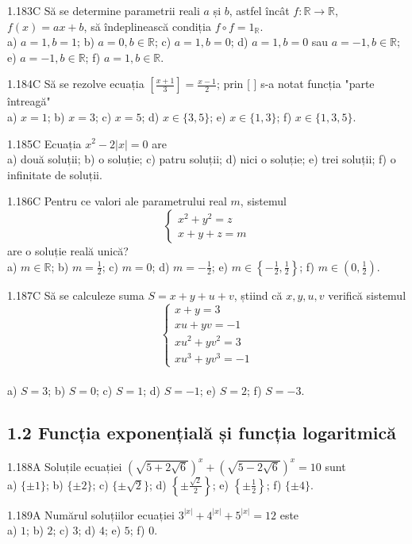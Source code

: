 \documentclass[11pt]{article}
\begin{document}
1.183C Să se determine parametrii reali $a$ și $b$, astfel încât $f: \mathbb{R} \rightarrow \mathbb{R}$, $f(x)=a x+b$, să îndeplinească condiția $f \circ f=1_{\mathbb{R}}$.\\ a) $a=1, b=1$; b) $a=0, b \in \mathbb{R}$; c) $a=1, b=0$; d) $a=1, b=0$ sau $a=-1, b \in \mathbb{R}$; e) $a=-1, b \in \mathbb{R}$; f) $a=1, b \in \mathbb{R}$.

1.184C Să se rezolve ecuația $\left[\frac{x+1}{3}\right]=\frac{x-1}{2}$; prin [ ] s-a notat funcția "parte întreagă"\\ a) $x=1$; b) $x=3$; c) $x=5$; d) $x \in\{3,5\}$; e) $x \in\{1,3\}$; f) $x \in\{1,3,5\}$.

1.185C Ecuația $x^{2}-2|x|=0$ are\\ a) două soluții; b) o soluție; c) patru soluții; d) nici o soluție; e) trei soluții; f) o infinitate de soluții.

1.186C Pentru ce valori ale parametrului real $m$, sistemul $$\left\{\begin{array}{l}x^{2}+y^{2}=z \\ x+y+z=m\end{array}\right.$$ are o soluție reală unică?\\ a) $m \in \mathbb{R}$; b) $m=\frac{1}{2}$; c) $m=0$; d) $m=-\frac{1}{2}$; e) $m \in\left\{-\frac{1}{2}, \frac{1}{2}\right\}$; f) $m \in\left(0, \frac{1}{2}\right)$.

1.187C Să se calculeze suma $S=x+y+u+v$, știind că $x, y, u, v$ verifică sistemul $$\left\{\begin{array}{l} x+y=3 \\ x u+y v=-1 \\ x u^{2}+y v^{2}=3 \\ x u^{3}+y v^{3}=-1 \end{array}\right.$$\\ a) $S=3$; b) $S=0$; c) $S=1$; d) $S=-1$; e) $S=2$; f) $S=-3$.

\subsection*{1.2 Funcția exponențială și funcția logaritmică}
1.188A Soluțile ecuației $(\sqrt{5+2 \sqrt{6}})^{x}+(\sqrt{5-2 \sqrt{6}})^{x}=10$ sunt\\ a) $\{ \pm 1\}$; b) $\{ \pm 2\}$; c) $\{ \pm \sqrt{2}\}$; d) $\left\{ \pm \frac{\sqrt{2}}{2}\right\}$; e) $\left\{ \pm \frac{1}{2}\right\}$; f) $\{ \pm 4\}$.

1.189A Numărul soluțiilor ecuației $3^{|x|}+4^{|x|}+5^{|x|}=12$ este\\ a) $1$; b) $2$; c) $3$; d) $4$; e) $5$; f) $0$.
\end{document}

